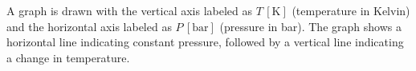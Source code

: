 A graph is drawn with the vertical axis labeled as \( T \, [\text{K}] \) (temperature in Kelvin) and the horizontal axis labeled as \( P \, [\text{bar}] \) (pressure in bar). The graph shows a horizontal line indicating constant pressure, followed by a vertical line indicating a change in temperature.